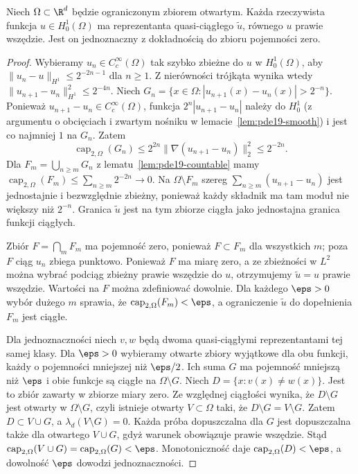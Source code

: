\begin{twierdzenie}
\label{thm:pde19-quasi}
Niech $\Omega\subset\R^d$ będzie ograniczonym zbiorem otwartym.
Każda rzeczywista funkcja $u\in H_0^1(\Omega)$ ma
reprezentanta quasi-ciągłego $\widetilde u$, równego $u$
prawie wszędzie. Jest on jednoznaczny z dokładnością
do zbioru pojemności zero.
\end{twierdzenie}
\begin{proof}
Wybieramy $u_n\in C_c^\infty(\Omega)$ tak szybko zbieżne
do $u$ w $H_0^1(\Omega)$, aby
$\|u_n-u\|_{H^1}\le2^{-2n-1}$ dla $n\ge1$.
Z nierówności trójkąta wynika wtedy
$\|u_{n+1}-u_n\|_{H^1}^2\le2^{-4n}$.
Niech $G_n=\{x\in\Omega:|u_{n+1}(x)-u_n(x)|>2^{-n}\}$.
Ponieważ $u_{n+1}-u_n\in C_c^\infty(\Omega)$,
funkcja $2^n|u_{n+1}-u_n|$ należy do $H_0^1$
(z argumentu o obcięciach i zwartym nośniku
w lemacie~\ref{lem:pde19-smooth}) i jest co najmniej
$1$ na $G_n$. Zatem
\[
 \operatorname{cap}_{2,\Omega}(G_n)
 \le2^{2n}\|\nabla(u_{n+1}-u_n)\|_2^2\le2^{-2n}.
\]
Dla $F_m=\bigcup_{n\ge m}G_n$ z
lematu~\ref{lem:pde19-countable} mamy
$\operatorname{cap}_{2,\Omega}(F_m)
\le\sum_{n\ge m}2^{-2n}\to0$.
Na $\Omega\setminus F_m$ szereg
$\sum_{n\ge m}(u_{n+1}-u_n)$ jest jednostajnie i bezwzględnie
zbieżny, ponieważ każdy składnik ma tam moduł nie większy niż
$2^{-n}$. Granica $\widetilde u$ jest na tym zbiorze ciągła
jako jednostajna granica funkcji ciągłych.

Zbiór $F=\bigcap_m F_m$ ma pojemność zero, ponieważ
$F\subset F_m$ dla wszystkich $m$; poza $F$
ciąg $u_n$ zbiega punktowo. Ponieważ $F$ ma miarę zero,
a ze zbieżności w $L^2$ można wybrać podciąg zbieżny
prawie wszędzie do $u$, otrzymujemy $\widetilde u=u$
prawie wszędzie. Wartości na $F$ można zdefiniować
dowolnie. Dla każdego $\eps>0$ wybór dużego $m$ sprawia,
że $\operatorname{cap}_{2,\Omega}(F_m)<\eps$,
a ograniczenie $\widetilde u$ do dopełnienia $F_m$
jest ciągłe.

Dla jednoznaczności niech $v,w$ będą dwoma
quasi-ciągłymi reprezentantami tej samej klasy.
Dla $\eps>0$ wybieramy otwarte zbiory wyjątkowe
dla obu funkcji, każdy o pojemności mniejszej niż
$\eps/2$. Ich suma $G$ ma pojemność mniejszą niż
$\eps$ i obie funkcje są ciągłe na $\Omega\setminus G$.
Niech $D=\{x:v(x)\ne w(x)\}$. Jest to zbiór zawarty
w zbiorze miary zero. Ze względnej ciągłości wynika,
że $D\setminus G$ jest otwarty w $\Omega\setminus G$,
czyli istnieje otwarty $V\subset\Omega$ taki, że
$D\setminus G=V\setminus G$. Zatem $D\subset V\cup G$,
a $\lambda_d(V\setminus G)=0$. Każda próba dopuszczalna
dla $G$ jest dopuszczalna także dla otwartego $V\cup G$,
gdyż warunek obowiązuje prawie wszędzie.
Stąd $\operatorname{cap}_{2,\Omega}(V\cup G)
=\operatorname{cap}_{2,\Omega}(G)<\eps$.
Monotoniczność daje $\operatorname{cap}_{2,\Omega}(D)<\eps$,
a dowolność $\eps$ dowodzi jednoznaczności.
\end{proof}

